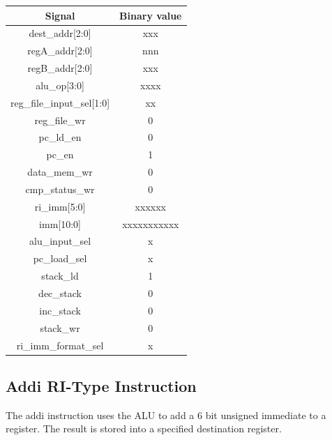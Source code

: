 \documentclass{article}
\begin{document}
\begin{par}
	\begin{center}
		\begin{tabular}{|c|c|}
			\hline 
			\textbf{Signal} & \textbf{Binary value} \\ 
			\hline 
			dest\_addr[2:0] & xxx \\ 
			\hline 
			regA\_addr[2:0] & nnn \\ 
			\hline 
			regB\_addr[2:0] & xxx \\ 
			\hline 
			alu\_op[3:0] & xxxx \\ 
			\hline 
			reg\_file\_input\_sel[1:0] & xx \\ 
			\hline 
			reg\_file\_wr & 0 \\ 
			\hline 
			pc\_ld\_en & 0 \\ 
			\hline 
			pc\_en & 1 \\ 
			\hline 
			data\_mem\_wr & 0 \\ 
			\hline 
			cmp\_status\_wr & 0 \\ 
			\hline 
			ri\_imm[5:0] & xxxxxx \\ 
			\hline 
			imm[10:0] & xxxxxxxxxxx \\ 
			\hline 
			alu\_input\_sel & x \\ 
			\hline 
			pc\_load\_sel & x \\ 
			\hline 
			stack\_ld & 1 \\ 
			\hline 
			dec\_stack & 0 \\ 
			\hline 
			inc\_stack & 0 \\ 
			\hline 
			stack\_wr & 0 \\ 
			\hline 
			ri\_imm\_format\_sel & x \\ 
			\hline 
		\end{tabular} 
	\end{center}

	\newpage
	\subsection{Addi RI-Type Instruction}
	
	The addi instruction uses the ALU to add a 6 bit unsigned immediate to a register. The result is stored into a specified destination register. 
	

\end{par}
\end{document}
